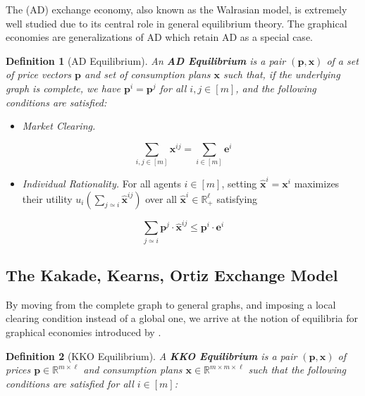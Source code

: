 \documentclass[cm,linguex]{glossa}
\providecommand{\tightlist}{%
  \setlength{\itemsep}{0pt}\setlength{\parskip}{0pt}}
\theoremstyle{defn}
\newtheorem{defn}{Definition}
\theoremstyle{axiom}
\theoremstyle{thm}
\theoremstyle{lem}
\theoremstyle{cor}
\theoremstyle{prop}
\theoremstyle{rmk}
\begin{document}
The \citet{AD} (AD) exchange economy, also known as the Walrasian model,
is extremely well studied due to its central role in general equilibrium
theory. The graphical economies are generalizations of AD which retain
AD as a special case.

\begin{defn}[AD Equilibrium]
An \textbf{AD Equilibrium} is a pair $(\mathbf{p}, \mathbf{x})$ of a set of price vectors $\mathbf{p}$ and set of consumption plans $\mathbf{x}$ such that, if the underlying graph is complete, we have $\mathbf{p}^i = \mathbf{p}^j$ for all $i, j \in [m]$, and the following conditions are satisfied:
\end{defn}

\begin{itemize}
\tightlist
\item
  \emph{Market Clearing.}
\end{itemize}

\[
\sum_{i,j \in [m]} \mathbf{x}^{ij} = \sum_{i \in [m]} \mathbf{e}^i
\]

\begin{itemize}
\tightlist
\item
  \emph{Individual Rationality.} For all agents \(i \in [m]\), setting
  \(\hat{\mathbf{x}}^i = \mathbf{x}^i\) maximizes their utility
  \(\displaystyle u_i \left( \sum_{j \simeq i} \hat{\mathbf{x}}^{ij} \right)\)
  over all \(\hat{\mathbf{x}}^i \in \mathbb{R}^\ell_+\) satisfying
\end{itemize}

\[
\sum_{j \simeq i} \mathbf{p}^j \cdot \hat{\mathbf{x}}^{ij} \leq \mathbf{p}^i \cdot \mathbf{e}^i
\]

\hypertarget{the-kakade-kearns-ortiz-exchange-model}{%
\subsection{The Kakade, Kearns, Ortiz Exchange
Model}\label{the-kakade-kearns-ortiz-exchange-model}}

By moving from the complete graph to general graphs, and imposing a
local clearing condition instead of a global one, we arrive at the
notion of equilibria for graphical economies introduced by \citet{KKO}.

\begin{defn}[KKO Equilibrium]
A \textbf{KKO Equilibrium} is a pair $(\mathbf{p}, \mathbf{x})$ of prices $\mathbf{p} \in \mathbb{R}^{m \times \ell}$ and consumption plans $\mathbf{x} \in \mathbb{R}^{m \times m \times \ell}$ such that the following conditions are satisfied for all $i \in [m]$:
\end{defn}
\end{document}
